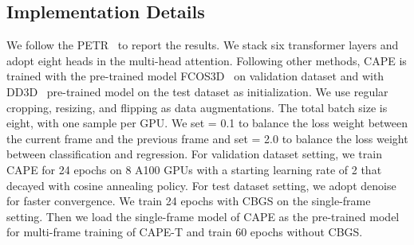 \documentclass[10pt,twocolumn,letterpaper]{article}
\newcommand{\ourMethod}{CAPE}
\begin{document}
\subsection{Implementation Details}
We follow the PETR~\cite{liu2022petr} to report the results. We stack six transformer layers and adopt eight heads in the multi-head attention. 
Following other methods\cite{liu2022petr,wang2022detr3d, huang2021bevdet}, \ourMethod{} is trained with the pre-trained model FCOS3D~\cite{wang2021fcos3d} on validation dataset and with DD3D~\cite{park2021pseudo} pre-trained model on the test dataset as initialization. We use regular cropping, resizing, and flipping as data augmentations. The total batch size is eight, with one sample per GPU. 
We set  = 0.1 to balance the loss weight between the current frame and the previous frame and set  = 2.0 to balance the loss weight between classification and regression. 
For validation dataset setting, we train \ourMethod{} for 24 epochs on 8 A100 GPUs with a starting learning rate of 2 that decayed with cosine annealing policy. 
For test dataset setting, we adopt denoise~\cite{zhang2022dino} for faster convergence. We train 24 epochs with CBGS on the single-frame setting. Then we load the single-frame model of CAPE as the pre-trained model for multi-frame training of CAPE-T and train 60 epochs without CBGS. 
\end{document}
